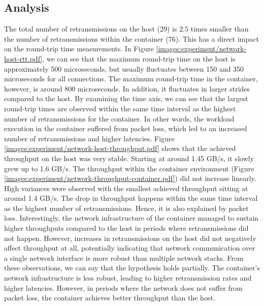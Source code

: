 \subsection{Analysis}
The total number of retransmissions on the host (29) is $2.5$ times smaller than 
the number of retransmissions within the container (76). This has a direct impact on 
the round-trip time measurements. In Figure  \ref{images:experiment/network-host-rtt.pdf}, we 
can see that the maximum round-trip time on the host is approximately 500 microseconds, but usually 
fluctuates between 150 and 350 microseconds for all connections. The maximum round-trip time 
in the container, however, is around 800 microseconds. In addition, 
it fluctuates in larger strides compared to the host. By examining the time axis, we can see 
that the largest round-trip times are observed within the same time interval as the 
highest number of retransmissions for the container. In other words, the workload execution 
in the container suffered from packet loss, which led to an increased number of retransmissions
and higher latencies. Figure \ref{images:experiment/network-host-throughput.pdf} shows 
that the achieved throughput on the host was very stable. Starting at around 1.45 GB/s, 
it slowly grew up to 1.6 GB/s. The throughput within the container environment (Figure \ref{images:experiment/network-throughput-container.pdf})
did not increase linearly. High variances were observed with the smallest achieved throughput 
sitting at around 1.4 GB/s. The drop in throughput happens within the same time interval 
as the highest number of retransmissions. Hence, it is also explained by packet loss.
Interestingly, the network infrastructure of the container managed to sustain higher 
throughputs compared to the host in periods where retransmissions did not happen.
However, increases in retransmissions on the host did not negatively affect throughput at all,
potentially indicating that network communication over a single network interface is more robust 
than multiple network stacks. From these observations, we can say that the hypothesis holds partially. 
The container's network infrastructure is less robust, leading to higher retransmission rates 
and higher latencies. However, in periods where the network does not suffer from packet loss, 
the container achieves better throughput than the host. 